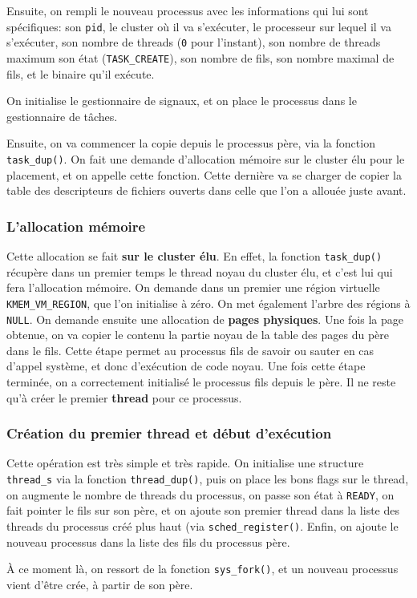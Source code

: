       Ensuite, on rempli le nouveau processus avec les informations qui lui sont
      spécifiques: son \texttt{pid}, le cluster où il va s'exécuter, le
      processeur sur lequel il va s'exécuter, son nombre de threads (\texttt{0}
      pour l'instant), son nombre de threads maximum son état
      (\texttt{TASK\_CREATE}), son nombre de fils, son nombre maximal de fils,
      et le binaire qu'il exécute. 

      On initialise le gestionnaire de signaux, et on place le processus dans le
      gestionnaire de tâches.

      Ensuite, on va commencer la copie depuis le processus père, via la
      fonction \texttt{task\_dup()}. On fait une demande d'allocation mémoire
      sur le cluster élu pour le placement, et on appelle cette fonction. Cette
      dernière va se charger de copier la table des descripteurs de fichiers
      ouverts dans celle que l'on a allouée juste avant.


    \subsubsection{L'allocation mémoire}

      Cette allocation se fait \textbf{sur le cluster élu}. En effet, la
      fonction \texttt{task\_dup()} récupère dans un premier temps le thread
      noyau du cluster élu, et c'est lui qui fera l'allocation mémoire. On
      demande dans un premier une région virtuelle \texttt{KMEM\_VM\_REGION},
      que l'on initialise à zéro. On met également l'arbre des régions à
      \texttt{NULL}. On demande ensuite une allocation de \textbf{pages
      physiques}. Une fois la page obtenue, on va copier le contenu la partie
      noyau de la table des pages du père dans le fils. Cette étape permet au
      processus fils de savoir ou sauter en cas d'appel système, et donc
      d'exécution de code noyau. Une fois cette étape terminée, on a
      correctement initialisé le processus fils depuis le père.  Il ne reste
      qu'à créer le premier \textbf{thread} pour ce processus.


    \subsubsection{Création du premier thread et début d'exécution}

      Cette opération est très simple et très rapide. On initialise une
      structure \texttt{thread\_s} via la fonction \texttt{thread\_dup()}, puis
      on place les bons flags sur le thread, on augmente le nombre de threads du
      processus, on passe son état à \texttt{READY}, on fait pointer le fils sur
      son père, et on ajoute son premier thread dans la liste des threads du
      processus créé plus haut (via \texttt{sched\_register()}. Enfin, on ajoute
      le nouveau processus dans la liste des fils du processus père.

      À ce moment là, on ressort de la fonction \texttt{sys\_fork()}, et un
      nouveau processus vient d'être crée, à partir de son père.
